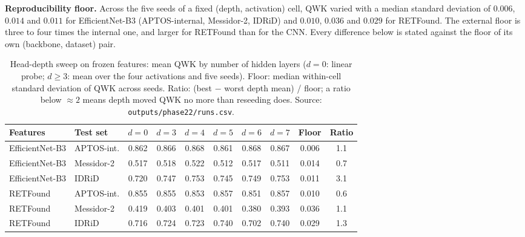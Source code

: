 \textbf{Reproducibility floor.} Across the five seeds of a fixed (depth,
activation) cell, QWK varied with a median standard deviation of $0.006$, $0.014$
and $0.011$ for EfficientNet-B3 (APTOS-internal, Messidor-2, IDRiD) and $0.010$,
$0.036$ and $0.029$ for RETFound. The external floor is three to four times the
internal one, and larger for RETFound than for the CNN. Every difference below is
stated against the floor of its own (backbone, dataset) pair.

\begin{table}[!t]
\centering\footnotesize
\caption{Head-depth sweep on frozen features: mean QWK by number of hidden
layers ($d=0$: linear probe; $d\geq3$: mean over the four activations and five
seeds). Floor: median within-cell standard deviation of QWK across seeds. Ratio:
(best $-$ worst depth mean) / floor; a ratio below $\approx 2$ means depth moved
QWK no more than reseeding does. Source: \texttt{outputs/phase22/runs.csv}.}
\label{tab:headdepth}
\setlength{\tabcolsep}{5pt}
\begin{tabular}{llcccccccc}
\toprule
Features & Test set & $d=0$ & $d=3$ & $d=4$ & $d=5$ & $d=6$ & $d=7$ & Floor & Ratio \\
\midrule
EfficientNet-B3 & APTOS-int. & 0.862 & 0.866 & 0.868 & 0.861 & 0.868 & 0.867 & 0.006 & 1.1 \\
EfficientNet-B3 & Messidor-2 & 0.517 & 0.518 & 0.522 & 0.512 & 0.517 & 0.511 & 0.014 & 0.7 \\
EfficientNet-B3 & IDRiD & 0.720 & 0.747 & 0.753 & 0.745 & 0.749 & 0.753 & 0.011 & 3.1 \\
\midrule
RETFound & APTOS-int. & 0.855 & 0.855 & 0.853 & 0.857 & 0.851 & 0.857 & 0.010 & 0.6 \\
RETFound & Messidor-2 & 0.419 & 0.403 & 0.401 & 0.401 & 0.380 & 0.393 & 0.036 & 1.1 \\
RETFound & IDRiD & 0.716 & 0.724 & 0.723 & 0.740 & 0.702 & 0.740 & 0.029 & 1.3 \\
\bottomrule
\end{tabular}
\end{table}

